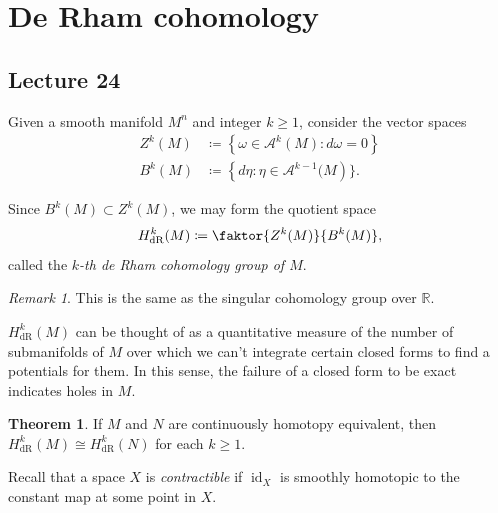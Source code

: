 \documentclass[10pt,letterpaper,cm]{nupset}
\theoremstyle{definition}
\theoremstyle{theorem}
\newtheorem{theorem}[definition]{Theorem}
\theoremstyle{remark}
\newtheorem{remark}[definition]{Remark}
\newcommand{\R}{\mathbb R}
\newcommand{\1}{\mathbf{1}}
\newcommand{\0}{\vec 0}
\DeclareMathOperator{\id}{id}
\DeclareMathOperator{\dr}{dR}
\begin{document}
\section{De Rham cohomology}

\subsection{Lecture 24}


Given a smooth manifold $M^n$ and integer $k\geq 1$, consider the vector spaces
\begin{align*}
  Z^k(M) &  \coloneqq \left\{\omega \in \mathcal{A}^k(M) : d\omega =0\right\}
 \\  B^k(M) & \coloneqq \left\{ d\eta : \eta \in \mathcal{A}^{k-1}(M\right)\}.
 \end{align*}

 Since $B^k(M) \subset Z^k(M)$, we may form the quotient space $$ H_{\dr}^k(M) \coloneqq  \faktor{Z^k(M)}{B^k(M)},$$ called the \textit{$k$-th de Rham cohomology group of $M$}.

\smallskip

\begin{remark}
This is the same as the singular cohomology group over $\R$.
\end{remark}

\smallskip

$H_{\dr}^k(M)$ can be thought of as a quantitative measure of the number of submanifolds of $M$ over which we can't integrate certain closed forms to find a potentials for them. In this sense, the failure of a closed form to be exact indicates holes in $M$.

\smallskip

\begin{theorem}
If $M$ and $N$ are continuously homotopy equivalent, then $H_{\dr}^k(M) \cong H_{\dr}^k(N)$ for each $k\geq 1$.
\end{theorem}

\medskip

Recall that a space $X$ is \textit{contractible} if $\id_X$ is smoothly homotopic to the constant map at some point in $X$. 
\end{document}
